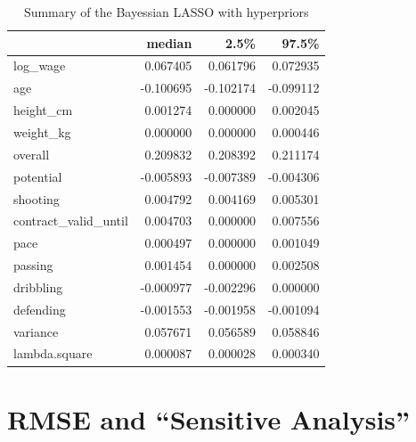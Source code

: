 \documentclass[12pt,a4paper]{article}
\begin{document}
\FloatBarrier
\begin{table}[!h]

\caption{\label{tab:tabel_bayes_1}\label{tab:sum_bay_hy} Summary of the  Bayessian LASSO with hyperpriors}
\centering
\begin{tabular}[t]{lrrr}
\toprule
  & median & 2.5\% & 97.5\%\\
\midrule
\rowcolor{gray!6}  log\_wage & 0.067405 & 0.061796 & 0.072935\\
age & -0.100695 & -0.102174 & -0.099112\\
\rowcolor{gray!6}  height\_cm & 0.001274 & 0.000000 & 0.002045\\
weight\_kg & 0.000000 & 0.000000 & 0.000446\\
\rowcolor{gray!6}  overall & 0.209832 & 0.208392 & 0.211174\\
potential & -0.005893 & -0.007389 & -0.004306\\
\rowcolor{gray!6}  shooting & 0.004792 & 0.004169 & 0.005301\\
contract\_valid\_until & 0.004703 & 0.000000 & 0.007556\\
\rowcolor{gray!6}  pace & 0.000497 & 0.000000 & 0.001049\\
passing & 0.001454 & 0.000000 & 0.002508\\
\rowcolor{gray!6}  dribbling & -0.000977 & -0.002296 & 0.000000\\
defending & -0.001553 & -0.001958 & -0.001094\\
\rowcolor{gray!6}  variance & 0.057671 & 0.056589 & 0.058846\\
lambda.square & 0.000087 & 0.000028 & 0.000340\\
\bottomrule
\end{tabular}
\end{table}
\FloatBarrier

\hypertarget{and-sensitive-analysis}{%
\section{\texorpdfstring{\acf{RMSE} and \enquote{Sensitive
Analysis}}{ and `Sensitive Analysis'}}\label{and-sensitive-analysis}}
\end{document}
